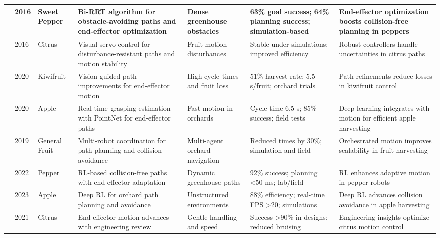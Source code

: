 \documentclass[pdflatex,sn-mathphys-num]{sn-jnl}
\begin{document}
\begin{table}[htbp]
\begin{tabular}{p{1.2cm}p{0.8cm}p{1.5cm}p{3cm}p{2.5cm}p{3cm}p{3.5cm}}
\cite{bac2016analysis} & 2016 & Sweet Pepper & Bi-RRT algorithm for obstacle-avoiding paths and end-effector optimization & Dense greenhouse obstacles & 63\% goal success; 64\% planning success; simulation-based & End-effector optimization boosts collision-free planning in peppers \\ \midrule
\cite{mehta2016robust} & 2016 & Citrus & Visual servo control for disturbance-resistant paths and motion stability & Fruit motion disturbances & Stable under simulations; improved efficiency & Robust controllers handle uncertainties in citrus paths \\ \midrule
\cite{williams2020improvements} & 2020 & Kiwifruit & Vision-guided path improvements for end-effector motion & High cycle times and fruit loss & 51\% harvest rate; 5.5 s/fruit; orchard trials & Path refinements reduce losses in kiwifruit control \\ \midrule
\cite{kang2020real} & 2020 & Apple & Real-time grasping estimation with PointNet for end-effector paths  & Fast motion in orchards & Cycle time 6.5 s; 85\% success; field tests & Deep learning integrates with motion for efficient apple harvesting \\ \midrule
\cite{vougioukas2019orchestra} & 2019 & General Fruit & Multi-robot coordination for path planning and collision avoidance  & Multi-agent orchard navigation & Reduced times by 30\%; simulation and field & Orchestrated motion improves scalability in fruit harvesting \\ \midrule
\cite{verbiest2022path} & 2022 & Pepper & RL-based collision-free paths with end-effector adaptation  & Dynamic greenhouse paths & 92\% success; planning <50 ms; lab/field & RL enhances adaptive motion in pepper robots \\ \midrule
\cite{zhang2023deep} & 2023 & Apple & Deep RL for orchard path planning and avoidance & Unstructured environments & 88\% efficiency; real-time FPS >20; simulations & Deep RL advances collision avoidance in apple harvesting \\ \midrule
\cite{burks2021engineering} & 2021 & Citrus & End-effector motion advances with engineering review  & Gentle handling and speed & Success >90\% in designs; reduced bruising & Engineering insights optimize citrus motion control \\ 
\bottomrule
\end{tabular}
\end{table}
\end{document}
